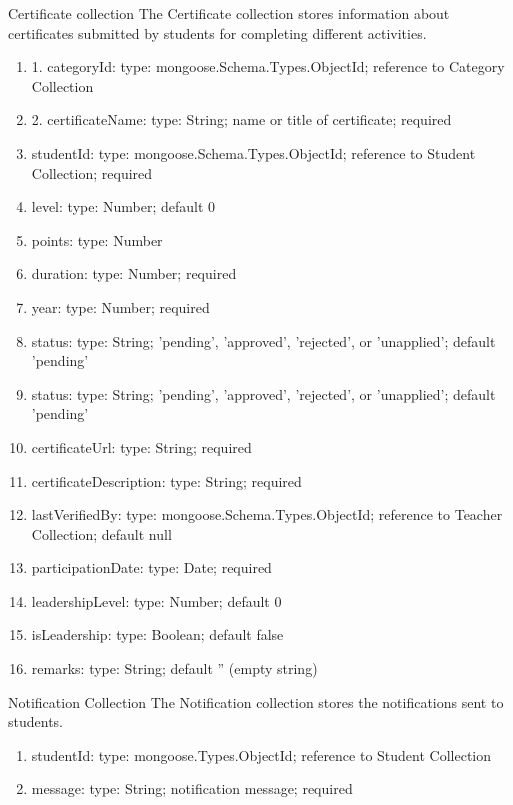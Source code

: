 \begin{frame}{Certificate collection}
The Certificate collection stores information about certificates submitted by students for completing different activities.
    \begin{enumerate}
\item 1. categoryId: {type: mongoose.Schema.Types.ObjectId}; reference to Category Collection
\item 2. certificateName: {type: String}; name or title of certificate; required
\item studentId: {type: mongoose.Schema.Types.ObjectId}; reference to Student Collection; required
\item level: {type: Number}; default 0
\item points: {type: Number}
\item duration: {type: Number}; required
\item year: {type: Number}; required
\item status: {type: String}; 'pending', 'approved', 'rejected', or 'unapplied'; default 'pending'
   

\item status: {type: String}; 'pending', 'approved', 'rejected', or 'unapplied'; default 'pending'
\item certificateUrl: {type: String}; required
\item certificateDescription: {type: String}; required
\item lastVerifiedBy: {type: mongoose.Schema.Types.ObjectId}; reference to Teacher Collection; default null
\item participationDate: {type: Date}; required
\item leadershipLevel: {type: Number}; default 0
\item isLeadership: {type: Boolean}; default false
\item remarks: {type: String}; default '' (empty string)
 \end{enumerate}
\end{frame}

\begin{frame}{Notification Collection}
The Notification collection stores the notifications sent to students.
\begin{enumerate}
\item studentId: {type: mongoose.Types.ObjectId}; reference to Student Collection
\item message: {type: String}; notification message; required
\end{enumerate}
    
\end{frame}

